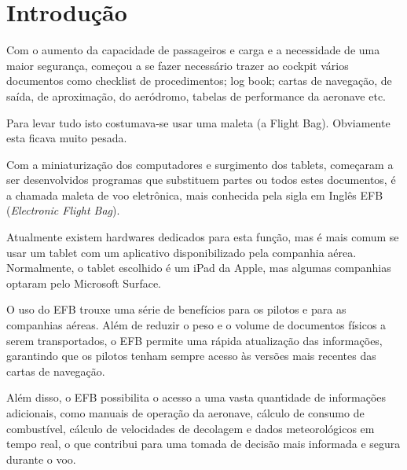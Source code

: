 \chapter{Introdução}
Com o aumento da capacidade de passageiros e carga e a necessidade 
de uma maior segurança, começou a se fazer necessário trazer ao cockpit 
vários documentos como checklist de procedimentos; log book; cartas de 
navegação, de saída, de aproximação, do aeródromo, tabelas de performance
 da aeronave etc.

Para levar tudo isto costumava-se usar uma maleta (a Flight Bag). Obviamente 
esta ficava muito pesada.

Com a miniaturização dos computadores e surgimento dos tablets, começaram a ser 
desenvolvidos programas que substituem partes ou todos estes documentos, é a
chamada maleta de voo eletrônica, mais conhecida pela sigla em Inglês EFB 
(\textit{Electronic Flight Bag}).

Atualmente existem hardwares dedicados para esta função, mas é mais comum se 
usar um tablet com um aplicativo disponibilizado pela companhia aérea. Normalmente, 
o tablet escolhido é um iPad da Apple, mas algumas companhias optaram pelo 
Microsoft Surface. \cite{surface}

O uso do EFB trouxe uma série de benefícios para os pilotos e para as companhias
aéreas. Além de reduzir o peso e o volume de documentos físicos a serem 
transportados, o EFB permite uma rápida atualização das informações, garantindo
 que os pilotos tenham sempre acesso às versões mais recentes das cartas de 
 navegação. \cite{EFB-more-than}

Além disso, o EFB possibilita o acesso a uma vasta quantidade de informações 
adicionais, como manuais de operação da aeronave, cálculo de consumo de combustível,
cálculo de velocidades de decolagem e dados meteorológicos em tempo real, o que 
contribui para uma tomada de decisão mais informada e segura durante o voo.
